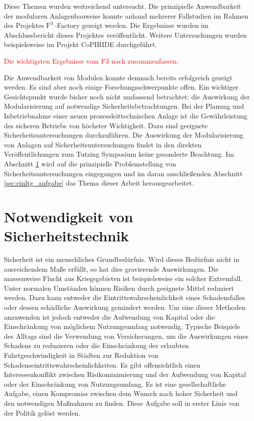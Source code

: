 Diese Themen wurden weitreichend untersucht. Die prinzipielle Anwendbarkeit der modularen Anlagenbauweise konnte anhand mehrerer Fallstudien im Rahmen des Projektes $\text{F}^{3}$--Factory gezeigt werden. Die Ergebnisse wurden im Abschlussbericht dieses Projektes \cite{f3_2014} ver\"offentlicht. \newline
Weitere Untersuchungen wurden beispielsweise im Projekt CoPIRIDE \cite{copiride_2014} durchgef\"uhrt.

\textcolor{red}{Die wichtigsten Ergebnisse vom F3 noch zusammenfassen.}

Die Anwendbarkeit von Modulen konnte demnach bereits erfolgreich gezeigt werden. Es sind aber noch einige Forschungsschwerpunkte offen. Ein wichtiger Gesichtspunkt wurde bisher noch nicht umfassend betrachtet: die Auswirkung der Modularisierung auf notwendige Sicherheitsbetrachtungen. \newline
Bei der Planung und Inbetriebnahme einer neuen prozessleittechnischen Anlage ist die Gew\"ahrleistung des sicheren Betriebs von h\"ochster Wichtigkeit. Dazu sind geeignete Sicherheitsuntersuchungen durchzuf\"uhren. Die Auswirkung der Modularisierung von Anlagen auf Sicherheitsuntersuchungen findet in den direkten Ver\"offentlichungen zum Tutzing Symposium keine gesonderte Beachtung. Im Abschnitt \ref{sec:einltg_sicherheitstechnik} wird auf die prinzipielle Problemstellung von Sicherheitsuntersuchungen eingegangen und im daran anschlie\ss{}enden Abschnitt \ref{sec:einltg_aufgabe} das Thema dieser Arbeit herausgearbeitet. 

\section{Notwendigkeit von Sicherheitstechnik} \label{sec:einltg_sicherheitstechnik}
Sicherheit ist ein menschliches Grundbed\"urfnis. Wird dieses Bed\"urfnis nicht in ausreichendem Ma\ss{}e erf\"ullt, so hat dies gravierende Auswirkungen. Die massenweise Flucht aus Kriegsgebieten ist beispielsweise ein solcher Extremfall. \newline
Unter normalen Umst\"anden k\"onnen Risiken durch geeignete Mittel reduziert werden. Dazu kann entweder die Eintrittswahrscheinlichkeit eines Schadensfalles oder dessen sch\"adliche Auswirkung gemindert werden. Um eine dieser Methoden anzuwenden ist jedoch entweder die Aufwendung von Kapital oder die Einschr\"ankung von m\"oglichem Nutzungsumfang notwendig. Typische Beispiele des Alltags sind die Verwendung von Versicherungen, um die Auswirkungen eines Schadens zu reduzieren oder die Einschr\"ankung der erlaubten Fahrtgeschwindigkeit in St\"adten zur Reduktion von Schadenseintrittswahrscheinlichkeiten. Es gibt offensichtlich einen Interessenkonflikt zwischen Risikominimierung und der Aufwendung von Kapital oder der Einschr\"ankung von Nutzungsumfang. \newline
Es ist eine gesellschaftliche Aufgabe, einen Kompromiss zwischen dem Wunsch nach hoher Sicherheit und den notwendigen Ma\ss{}nahmen zu finden. Diese Aufgabe soll in erster Linie von der Politik gel\"ost werden.

